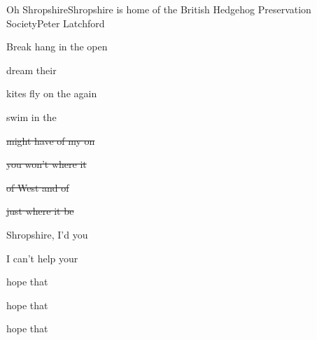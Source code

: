 \begin{SBSong}{Oh Shropshire}{Shropshire is home of the British Hedgehog Preservation Society}{Peter Latchford}
  \begin{SBBracket}{Break}
     hang in the open 

     dream their 

     kites fly on the  again

     swim in the 
  \end{SBBracket}

  \CBPageBrk

  \begin{SBVerse}
    \sout{ might have  of my  on }

    \sout{ you won't  where it }

    \sout{ of West and  of }

    \sout{ just where it  be}
  \end{SBVerse}


  \begin{SBChorus}
     Shropshire, I'd  you 

     I can't help  your 

     hope that  

     hope that  

     hope that   
  \end{SBChorus}
\end{SBSong}